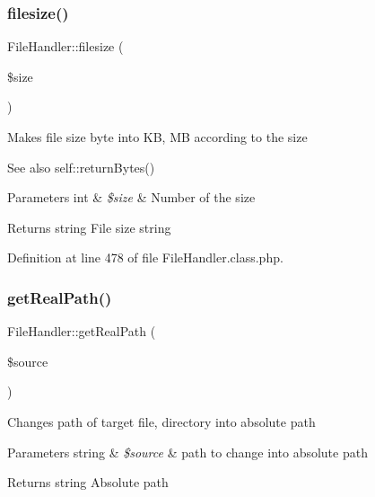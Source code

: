 \mbox{\label{classFileHandler_ae235b4ded589fb13caed260fabc0a30c}} 
\subsubsection{\texorpdfstring{filesize()}{filesize()}}
{\footnotesize\ttfamily File\+Handler\+::filesize (\begin{DoxyParamCaption}\item[{}]{\$size }\end{DoxyParamCaption})}

Makes file size byte into KB, MB according to the size

\begin{DoxySeeAlso}{See also}
self\+::return\+Bytes() 
\end{DoxySeeAlso}

\begin{DoxyParams}[1]{Parameters}
int & {\em \$size} & Number of the size \\
\hline
\end{DoxyParams}
\begin{DoxyReturn}{Returns}
string File size string 
\end{DoxyReturn}


Definition at line 478 of file File\+Handler.\+class.\+php.

\mbox{\label{classFileHandler_a6370b3eeddb705be04d9f60902a746e0}} 
\subsubsection{\texorpdfstring{get\+Real\+Path()}{getRealPath()}}
{\footnotesize\ttfamily File\+Handler\+::get\+Real\+Path (\begin{DoxyParamCaption}\item[{}]{\$source }\end{DoxyParamCaption})}

Changes path of target file, directory into absolute path


\begin{DoxyParams}[1]{Parameters}
string & {\em \$source} & path to change into absolute path \\
\hline
\end{DoxyParams}
\begin{DoxyReturn}{Returns}
string Absolute path 
\end{DoxyReturn}


